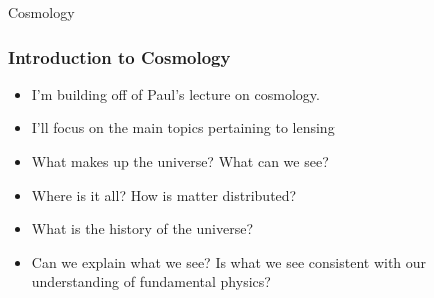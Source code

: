 \documentclass{beamer}
\begin{document}
\frame
{

    {\huge Cosmology}

}

\frame
{
    \frametitle{Introduction to Cosmology}


    \begin{itemize}

        \item I'm building off of Paul's lecture on cosmology.

        \item I'll focus on the main topics pertaining to lensing

        \item What makes up the universe? What can we see?

        \item Where is it all?  How is matter distributed?

        \item What is the history of the universe?

        \item Can we explain what we see?  Is what we see consistent with our
            understanding of fundamental physics?

    \end{itemize}

}
\end{document}
